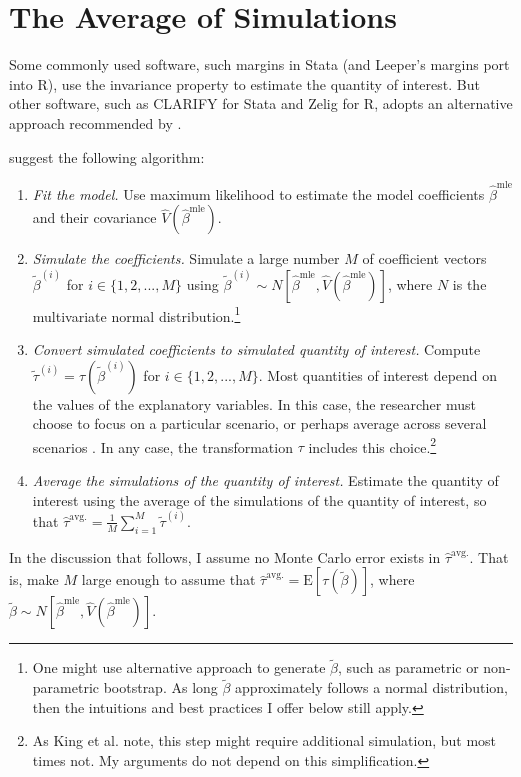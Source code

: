 \documentclass[10pt]{article}
\begin{document}
\section*{The Average of Simulations}

Some commonly used software, such margins in Stata (and Leeper's margins port into R), use the invariance property to estimate the quantity of interest. 
But other software, such as CLARIFY for Stata and Zelig for R, adopts an alternative approach recommended by \cite{KingTomzWittenberg2000}. 

\cite{KingTomzWittenberg2000} suggest the following algorithm: 

\begin{enumerate}
\item \textit{Fit the model.} 
Use maximum likelihood to estimate the model coefficients $\hat{\beta}^{\text{mle}}$ and their covariance $\hat{V} \left( \hat{\beta}^{\text{mle}} \right)$.
\item \textit{Simulate the coefficients.} 
Simulate a large number $M$ of coefficient vectors $\tilde{\beta}^{(i)}$ for $i \in \{1, 2, ... , M\}$ using $\tilde{\beta}^{(i)} \sim N \left[ \hat{\beta}^{\text{mle}}, \hat{V} \left( \hat{\beta}^{\text{mle}} \right) \right]$, where $N$ is the multivariate normal distribution.\footnote{One might use alternative approach to generate $\tilde{\beta}$, such as parametric or non-parametric bootstrap. As long $\tilde{\beta}$ approximately follows a normal distribution, then the intuitions and best practices I offer below still apply.}
\item \textit{Convert simulated coefficients to simulated quantity of interest.} 
Compute $\tilde{\tau}^{(i)} = \tau \left( \tilde{\beta}^{(i)} \right)$ for $i \in \{1, 2, ... , M\}$. 
Most quantities of interest depend on the values of the explanatory variables. 
In this case, the researcher must choose to focus on a particular scenario, or perhaps average across several scenarios \citep{HanmerKalkan2013}. 
In any case, the transformation $\tau$ includes this choice.\footnote{As King et al. note, this step might require additional simulation, but most times not. My arguments do not depend on this simplification.}
\item \textit{Average the simulations of the quantity of interest.} 
Estimate the quantity of interest using the average of the simulations of the quantity of interest, so that $\hat{\tau}^{\text{avg.}} = \frac{1}{M} \sum_{i = 1}^{M} \tilde{\tau}^{(i)}$.
\end{enumerate}
In the discussion that follows, I assume no Monte Carlo error exists in $\hat{\tau}^{\text{avg.}}$. 
That is, make $M$ large enough to assume that $\hat{\tau}^{\text{avg.}} = \text{E}\left[ \tau \left(\tilde{\beta} \right) \right]$, where $\tilde{\beta} \sim N \left[ \hat{\beta}^{\text{mle}}, \hat{V} \left( \hat{\beta}^{\text{mle}} \right) \right]$. 
\end{document}
